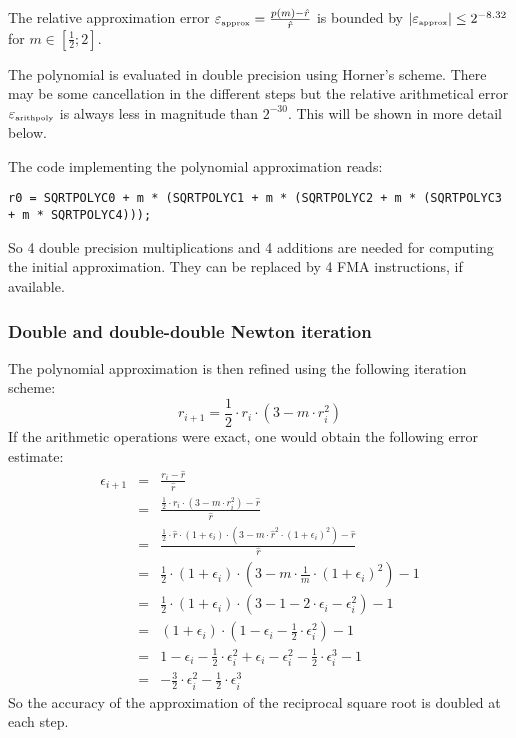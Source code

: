 The relative approximation error $\epsilon_{\mbox{\tiny approx}} =
\frac{p\left( m\right) - \hat{r}}{\hat{r}}$ is bounded by $\left \vert
\epsilon_{\mbox{\tiny approx}} \right \vert \leq 2^{-8.32}$ for $m \in
\left[ \frac{1}{2}; 2 \right]$.

The polynomial is evaluated in double precision using Horner's
scheme. There may be some cancellation in the different steps but the
relative arithmetical error $\epsilon_{\mbox{\tiny arithpoly}}$ is
always less in magnitude than $2^{-30}$. This will be shown in more
detail below.

The code implementing the polynomial approximation reads:
\begin{lstlisting}[caption={Polynomial approximation},firstnumber=1]
r0 = SQRTPOLYC0 + m * (SQRTPOLYC1 + m * (SQRTPOLYC2 + m * (SQRTPOLYC3 + m * SQRTPOLYC4)));
\end{lstlisting}
So 4 double precision multiplications and 4 additions are needed for computing the
initial approximation. They can be replaced by 4 FMA instructions, if available.

\subsubsection{Double and double-double Newton iteration}
The polynomial approximation is then refined using the following iteration scheme:
$$r_{i+1} = \frac{1}{2} \cdot r_i \cdot (3 - m \cdot r_i^2)$$
If the arithmetic operations were exact, one would obtain the following error estimate:
\begin{eqnarray*}
\epsilon_{i+1} & = & \frac{r_i - \hat{r}}{\hat{r}} \\ & = &
\frac{\frac{1}{2} \cdot r_i \cdot \left(3 - m \cdot r_i^2\right) -
\hat{r}}{\hat{r}} \\ 
& = & \frac{\frac{1}{2} \cdot \hat{r} \cdot
\left( 1 + \epsilon_i \right) \cdot \left( 3 - m \cdot \hat{r}^2 \cdot
\left( 1 + \epsilon_i \right)^2 \right) - \hat{r}}{\hat{r}} \\
& = & \frac{1}{2} \cdot \left( 1 + \epsilon_i \right) \cdot \left( 3 - m \cdot \frac{1}{m} \cdot \left( 1 + 
\epsilon_i\right)^2 \right) - 1 \\
& = & \frac{1}{2} \cdot \left( 1 + \epsilon_i \right) \cdot \left( 3 - 1 - 2 \cdot \epsilon_i - \epsilon_i^2  
\right) - 1 \\
& = & \left( 1 + \epsilon_i \right) \cdot \left( 1 - \epsilon_i - \frac{1}{2} \cdot \epsilon_i^2  
\right) - 1 \\
& = & 1 - \epsilon_i - \frac{1}{2} \cdot \epsilon_i^2 + \epsilon_i - \epsilon_i^2 - \frac{1}{2} \cdot \epsilon_i^3 - 1\\
& = & - \frac{3}{2} \cdot \epsilon_i^2 - \frac{1}{2} \cdot \epsilon_i^3
\end{eqnarray*}
So the accuracy of the approximation of the reciprocal square root is doubled at each step.

